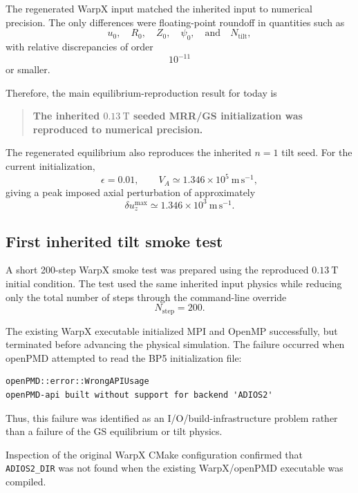 \documentclass[11pt,a4paper]{article}
\begin{document}
The regenerated WarpX input matched the inherited input to numerical
precision. The only differences were floating-point roundoff in quantities
such as
\[
u_0,\quad R_0,\quad Z_0,\quad \psi_0,\quad \text{and}\quad N_{\mathrm{tilt}},
\]
with relative discrepancies of order
\[
10^{-11}
\]
or smaller.

Therefore, the main equilibrium-reproduction result for today is

\begin{quote}
\textbf{The inherited $0.13~\mathrm{T}$ seeded MRR/GS initialization was
reproduced to numerical precision.}
\end{quote}

The regenerated equilibrium also reproduces the inherited $n=1$ tilt seed.
For the current initialization,
\[
\epsilon = 0.01,
\qquad
V_A \simeq 1.346\times10^5~\mathrm{m\,s^{-1}},
\]
giving a peak imposed axial perturbation of approximately
\[
\delta u_z^{\mathrm{max}}
\simeq 1.346\times10^3~\mathrm{m\,s^{-1}}.
\]

\subsection{First inherited tilt smoke test}

A short 200-step WarpX smoke test was prepared using the reproduced
$0.13~\mathrm{T}$ initial condition. The test used the same inherited input
physics while reducing only the total number of steps through the command-line
override
\[
N_{\mathrm{step}} = 200.
\]

The existing WarpX executable initialized MPI and OpenMP successfully, but
terminated before advancing the physical simulation. The failure occurred
when openPMD attempted to read the BP5 initialization file:

\begin{verbatim}
openPMD::error::WrongAPIUsage
openPMD-api built without support for backend 'ADIOS2'
\end{verbatim}

Thus, this failure was identified as an I/O/build-infrastructure problem
rather than a failure of the GS equilibrium or tilt physics.

Inspection of the original WarpX CMake configuration confirmed that
\texttt{ADIOS2\_DIR} was not found when the existing WarpX/openPMD executable
was compiled.
\end{document}
